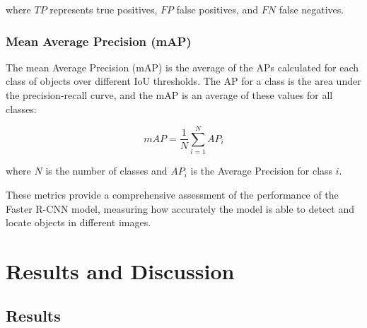 \documentclass[12pt,oneside]{book} %
\begin{document}
where $TP$ represents true positives, $FP$ false positives, and $FN$ false
negatives.

\subsection{Mean Average Precision (mAP)}

The mean Average Precision (mAP) is the average of the APs calculated for each
class of objects over different IoU thresholds. The AP for a class is the area
under the precision-recall curve, and the mAP is an average of these values for
all classes:

\begin{equation}
    mAP = \frac{1}{N} \sum_{i=1}^{N} AP_i
\end{equation}

where $N$ is the number of classes and $AP_i$ is the Average Precision for
class $i$.

These metrics provide a comprehensive assessment of the performance of the
Faster R-CNN model, measuring how accurately the model is able to detect and
locate objects in different images.

\chapter{Results and Discussion}
\section{Results}
\end{document}
